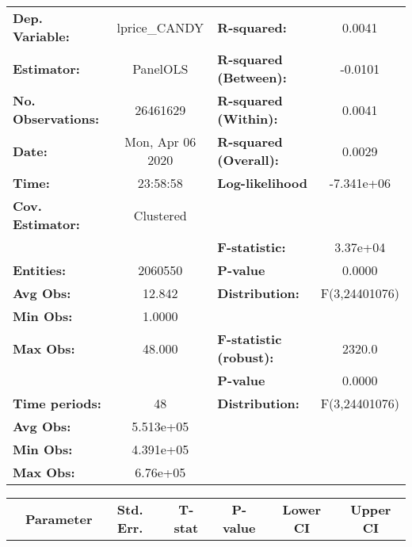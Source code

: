 \documentclass{report}
\begin{document}
\begin{center}
\begin{tabular}{lclc}
\toprule
\textbf{Dep. Variable:}    &   lprice\_CANDY    & \textbf{  R-squared:         }   &      0.0041      \\
\textbf{Estimator:}        &      PanelOLS      & \textbf{  R-squared (Between):}  &     -0.0101      \\
\textbf{No. Observations:} &      26461629      & \textbf{  R-squared (Within):}   &      0.0041      \\
\textbf{Date:}             &  Mon, Apr 06 2020  & \textbf{  R-squared (Overall):}  &      0.0029      \\
\textbf{Time:}             &      23:58:58      & \textbf{  Log-likelihood     }   &    -7.341e+06    \\
\textbf{Cov. Estimator:}   &     Clustered      & \textbf{                     }   &                  \\
\textbf{}                  &                    & \textbf{  F-statistic:       }   &     3.37e+04     \\
\textbf{Entities:}         &      2060550       & \textbf{  P-value            }   &      0.0000      \\
\textbf{Avg Obs:}          &       12.842       & \textbf{  Distribution:      }   &  F(3,24401076)   \\
\textbf{Min Obs:}          &       1.0000       & \textbf{                     }   &                  \\
\textbf{Max Obs:}          &       48.000       & \textbf{  F-statistic (robust):} &      2320.0      \\
\textbf{}                  &                    & \textbf{  P-value            }   &      0.0000      \\
\textbf{Time periods:}     &         48         & \textbf{  Distribution:      }   &  F(3,24401076)   \\
\textbf{Avg Obs:}          &     5.513e+05      & \textbf{                     }   &                  \\
\textbf{Min Obs:}          &     4.391e+05      & \textbf{                     }   &                  \\
\textbf{Max Obs:}          &      6.76e+05      & \textbf{                     }   &                  \\
\bottomrule
\end{tabular}
\begin{tabular}{lcccccc}
                           & \textbf{Parameter} & \textbf{Std. Err.} & \textbf{T-stat} & \textbf{P-value} & \textbf{Lower CI} & \textbf{Upper CI}  \\

\end{tabular}
\end{center}
\end{document}
